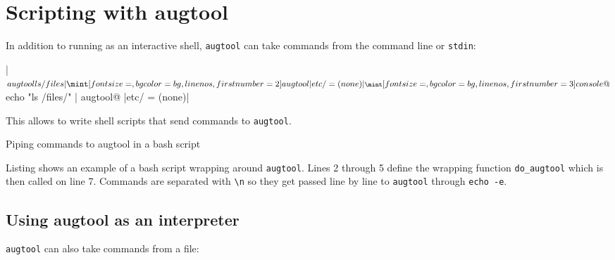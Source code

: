 \begin{quote}
\end{quote}


\section{Scripting with augtool}


In addition to running as an interactive shell, \verb!augtool! can take commands from the command line or \verb!stdin!:

 

\consolecode[linenos]|$ augtool ls /files|
\augtoolcode[linenos,firstnumber=2]|etc/ = (none)|
\consolecode[linenos,firstnumber=3]@$ echo "ls /files/" | augtool@
\augtoolcode[linenos,firstnumber=4]|etc/ = (none)|

This allows to write shell scripts that send commands to \verb!augtool!.

  

\begin{listing}
  \caption{Piping commands to augtool in a bash script}
  \label{lst:augtool_wrap}
\end{listing}


\begin{quote}
\end{quote}

Listing  shows an example of a bash script wrapping around \verb!augtool!. Lines 2 through 5 define the wrapping function \verb!do_augtool! which is then called on line 7. Commands are separated with \verb!\n! so they get passed line by line to \verb!augtool! through \verb!echo -e!.


\subsection{Using augtool as an interpreter}

\verb!augtool! can also take commands from a file:

